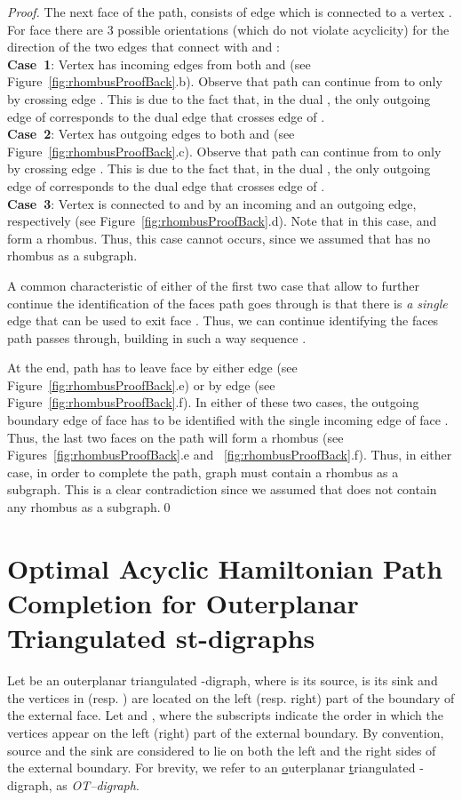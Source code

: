 \documentclass{myllncs-mixalis}
\begin{document}
\begin{proof}
The next face  of the path,  consists of edge  which
is connected to a vertex . For face
 there are 3 possible
orientations (which do not violate acyclicity) for the direction of
the two edges that connect  with  and :\\
\textbf{Case~1}: Vertex  has incoming edges from both 
and  (see Figure~\ref{fig:rhombusProofBack}.b). Observe that
path  can continue from  to  only by crossing
edge . This is due to the fact that, in the dual ,
the only outgoing edge of  corresponds to the dual edge that
crosses edge  of . \\
\textbf{Case~2}: Vertex  has outgoing edges to both  and
 (see Figure~\ref{fig:rhombusProofBack}.c). Observe that path
 can continue from  to  only by crossing edge
. This is due to the fact that, in the dual , the
only outgoing edge of  corresponds to the dual edge that
crosses edge  of . \\
\textbf{Case~3}: Vertex  is connected to    and  by
an incoming and an outgoing edge, respectively (see
Figure~\ref{fig:rhombusProofBack}.d). Note that in this case, 
and  form a rhombus. Thus, this case cannot occurs, since we
assumed that  has no rhombus as a subgraph.

A common characteristic of either of the first two case that allow
to further continue the identification of the faces path  
goes through is that there is \emph{a single} edge that can be used
to exit face . Thus, we can continue identifying the faces path
  passes through, building in such a way sequence .

At the end, path  has to leave face  by either
edge  (see
Figure~\ref{fig:rhombusProofBack}.e) or by edge 
(see Figure~\ref{fig:rhombusProofBack}.f). In either of these two
cases, the outgoing boundary edge of face
 has to be identified with the single incoming edge of face
. Thus, the last two
faces on the path  will form a rhombus (see
Figures~\ref{fig:rhombusProofBack}.e and
~\ref{fig:rhombusProofBack}.f). Thus, in either case, in order to
complete the path, graph  must contain a rhombus as a subgraph.
This is a clear contradiction since we assumed that  does not
contain any rhombus as a subgraph.\qed
\end{proof}



\section{Optimal Acyclic Hamiltonian Path Completion for Outerplanar Triangulated st-digraphs}
Let  be an outerplanar
triangulated -digraph, where  is its source,  is its sink
and  the vertices in  (resp. ) are located on the left
(resp. right) part of the boundary of the external face. Let  and ,
where the subscripts indicate the order in which the vertices appear
on the left (right) part of the external boundary. By convention,
source and the sink are considered to lie on both the left and the
right sides of the external boundary. For brevity, we refer to an
\underline{o}uterplanar \underline{t}riangulated -digraph, as
\emph{OT--digraph}.
\end{document}
